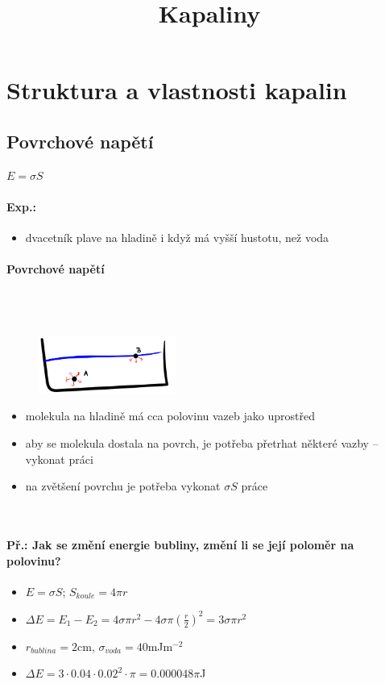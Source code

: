 \title{Kapaliny}


\section{Struktura a vlastnosti kapalin}

\subsection{Povrchové napětí}
$E = \sigma S$

\paragraph{Exp.: }
\begin{itemize}
\item dvacetník plave na hladině i když má vyšší hustotu, než voda
\end{itemize}

\paragraph{Povrchové napětí}\mbox{} \\ \mbox{} \\
\begin{figure}
\includegraphics[width=0.4\textwidth]{pictures/007.png}
\vspace{-40px}
\end{figure}

\begin{itemize}
\item molekula na hladině má cca polovinu vazeb jako uprostřed
\item aby se molekula dostala na povrch, je potřeba přetrhat některé vazby -- vykonat práci
\item na zvětšení povrchu je potřeba vykonat $\sigma S$ práce
\end{itemize} \mbox{} \\

\paragraph{Př.: Jak se změní energie bubliny, změní li se její poloměr na polovinu?}
\begin{itemize}
\item $E = \sigma S$; $S_{koule} = 4\pi r$
\item $\Delta E = E_1 - E_2 = 4 \sigma \pi r^2 - 4 \sigma \pi (\frac{r}{2})^2 = 3 \sigma \pi r^2$
\item $r_{bublina} = 2$cm, $\sigma_{voda} = 40$mJm$^{-2}$
\item $\Delta E = 3 \cdot 0.04 \cdot 0.02^2 \cdot \pi = 0.000048 \pi$J 
\end{itemize}

